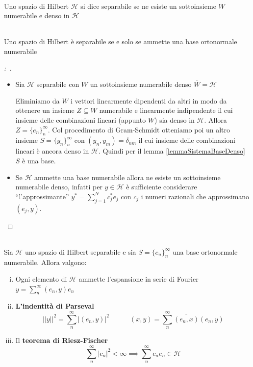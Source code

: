 \documentclass[11pt,a4paper,twoside]{book}
\newenvironment{teorema}[1][\empty]{\begin{Teorema}{
\ifx\empty#1\relax\else\mdseries\itshape#1\\\fi
}{}}{\end{Teorema}}
\newenvironment{definizione}[1][\empty]{\begin{Definizione}{
\ifx\empty#1\relax\else\mdseries\itshape#1\\\fi
}{}}{\end{Definizione}}
\newenvironment{dimo}[1][\proofname]{
	\begin{tcolorbox}[
	breakable, 
	enhanced, 
	interior hidden, 
	frame hidden, 
	borderline west = {1pt}{0pt}{gray}, 
	top=0pt, bottom=0pt, left=0pt]
\begin{proof}[#1:~]
}
{
\end{proof}
\end{tcolorbox}
}
\theoremstyle{esss}
\theoremstyle{dotless}
\numberwithin{equation}{section} %
\begin{document}
\begin{definizione}Uno spazio di Hilbert $\mathcal{H}$ si dice separabile se ne esiste un sottoinsieme $W$ numerabile e denso in $\mathcal{H}$\end{definizione}

\begin{teorema}Uno spazio di Hilbert è separabile se e solo se ammette una base ortonormale numerabile\end{teorema}

\begin{dimo}~

\begin{itemize} 
\item Sia $\mathcal{H}$ separabile con $W$ un sottoinsieme numerabile denso $\overline{W}=\mathcal{H}$

Eliminiamo da $W$ i vettori linearmente dipendenti da altri in modo da ottenere un insieme $Z\subseteq W$ numerabile e linearmente indipendente il cui insieme delle combinazioni lineari (appunto $W$) sia denso in $\mathcal{H}$. Allora $Z=\{e_n\}_n^\infty$. Col procedimento di Gram-Schmidt otteniamo poi un altro insieme $S=\{y_n\}_n^\infty$ con $(y_n,y_m)=\delta_{nm}$ il cui insieme delle combinazioni lineari è ancora denso in $\mathcal{H}$. Quindi per il lemma \ref{lemmaSistemaBaseDenso} $S$ è una base.
\item Se $\mathcal{H}$ ammette una base numerabile allora ne esiste un sottoinsieme numerabile denso, infatti per $y\in\mathcal{H}$ è sufficiente considerare ``l'approssimante'' $y^*=\sum_{j=1}^N c_j^* e_j$ con $c_j$ i numeri razionali che approssimano $(e_j,y)$.\qedhere 
\end{itemize}
\end{dimo}

\begin{teorema}
Sia $\mathcal{H}$ uno spazio di Hilbert separabile e sia $S=\{e_n\}_n^\infty$ una base ortonormale numerabile.
Allora valgono:\begin{enumerate}[i.]
\item Ogni elemento di $\mathcal{H}$ ammette l'espansione in serie di Fourier $y=\sum_n^\infty (e_n,y)e_n$ 
\item \textbf{ L'indentità di Parseval} \[||y||^2=\sum_n^\infty \left|(e_n,y)\right|^2 \qquad \quad(x,y)=\sum_n^\infty \overline{(e_n,x)}(e_n,y)\]
\item Il \textbf{teorema di Riesz-Fischer} 
\[ \sum_n^\infty|c_n|^2<\infty \implies \sum_n^\infty c_n e_n\in\mathcal{H}\]
\end{enumerate}
\end{teorema}
\end{document}
